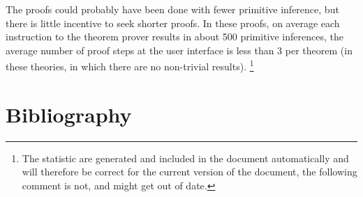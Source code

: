 The proofs could probably have been done with fewer primitive inference, but there is little incentive to seek shorter proofs.
In these proofs, on average each instruction to the theorem prover results in about 500 primitive inferences, the average number of proof steps at the user interface is less than 3 per theorem (in these theories, in which there are no non-trivial results).
\footnote{The statistic are generated and included in the document automatically and will therefore be correct for the current version of the document, the following comment is not, and might get out of date.}

\pagebreak

\section*{Bibliography}\label{BIBLIOGRAPHY}

{\def\section*#1{\ignore{#1}}
\raggedright


} %

{
{\small\printindex}}


